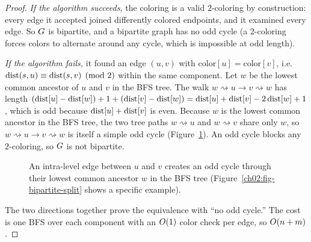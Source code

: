 \begin{proof}
\emph{If the algorithm succeeds,} the coloring is a valid $2$-coloring by
construction: every edge it accepted joined differently colored endpoints, and it
examined every edge. So $G$ is bipartite, and a bipartite graph has no odd
cycle (a $2$-coloring forces colors to alternate around any cycle, which is
impossible at odd length).

\emph{If the algorithm fails,} it found an edge $(u,v)$ with
$\mathrm{color}[u]=\mathrm{color}[v]$, i.e.\ $\operatorname{dist}(s,u)\equiv\operatorname{dist}(s,v)
\pmod 2$ within the same component. Let $w$ be the lowest common ancestor of $u$
and $v$ in the BFS tree. The walk
$w\rightsquigarrow u\to v\rightsquigarrow w$ has length
$(\operatorname{dist}[u]-\operatorname{dist}[w])+1+(\operatorname{dist}[v]-\operatorname{dist}[w]) = \operatorname{dist}[u]+\operatorname{dist}[v]-2\operatorname{dist}[w]+1$,
which is odd because $\operatorname{dist}[u]+\operatorname{dist}[v]$ is even. Because $w$ is the lowest
common ancestor in the BFS tree, the two tree paths $w\rightsquigarrow u$ and
$w\rightsquigarrow v$ share only $w$, so $w\rightsquigarrow u\to v\rightsquigarrow w$
is itself a simple odd cycle (Figure~\ref{ch02:fig-odd-cycle}). An odd cycle blocks any
$2$-coloring, so $G$ is not bipartite.

\begin{figure}[htbp]
\centering
{}
\caption{An intra-level edge between $u$ and $v$ creates an odd cycle through their lowest common ancestor $w$ in the BFS tree (Figure~\ref{ch02:fig-bipartite-split} shows a specific example).}
\label{ch02:fig-odd-cycle}
\end{figure}

The two directions together prove the equivalence with ``no odd cycle.'' The cost
is one BFS over each component with an $O(1)$ color check per edge, so
$O(n+m)$.
\end{proof}


